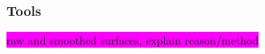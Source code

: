 \documentclass[aps,pra,english,notitlepage,reprint,nofootinbib]{revtex4-1}  %
\begin{document}
\subsubsection{Tools}\label{subsubsec:tools}




\colorbox{magenta}{raw and smoothed surfaces, explain reason/method}




\end{document}
